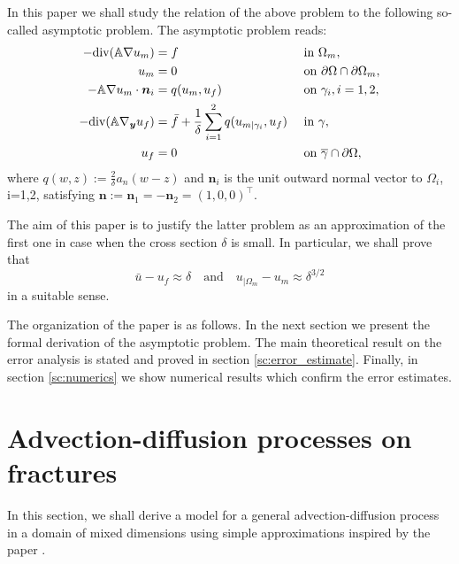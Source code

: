 \documentclass[a4paper]{article}
\def\vc#1{\mathbf{\boldsymbol{#1}}}     %
\def\tn#1{{\mathbb{#1}}}    %
\def\div{{\rm div}}
\def\yy{{\vc y}}
\begin{document}
In this paper we shall study the relation of the above problem to the following so-called asymptotic problem.
The asymptotic problem reads:
\begin{subequations}
\label{eq:asymptotic_pde}
\begin{align}
-\div(\tn A\nabla u_m) &= f &&\mbox{ in }\Omega_m,\\
u_m &= 0 &&\mbox{ on }\partial\Omega\cap\partial\Omega_m,\\
-\tn A\nabla u_m\cdot\vc n_i &= q(u_m,u_f) &&\mbox{ on }\gamma_i,i=1,2,\\
-\div(\tn A\nabla_\yy u_f) &= \bar f + \frac1\delta\sum_{i=1}^2 q(u_{m|\gamma_i},u_f) &&\mbox{ in }\gamma,\\
u_f &= 0 &&\mbox{ on }\overline\gamma\cap\partial\Omega,
\end{align}
\end{subequations}
where $q(w,z):=\frac2\delta a_n(w-z)$ and $\vc n_i$ is the unit outward normal vector to $\Omega_i$, i=1,2, satisfying $\vc n:=\vc n_1=-\vc n_2=(1,0,0)^\top$.

The aim of this paper is to justify the latter problem as an approximation of the first one in case when the cross section $\delta$ is small.
In particular, we shall prove that
\[ \bar u - u_f \approx \delta\quad\mbox{and}\quad u_{|\Omega_m}-u_m \approx \delta^{3/2} \]
in a suitable sense.

The organization of the paper is as follows.
In the next section we present the formal derivation of the asymptotic problem.
The main theoretical result on the error analysis is stated and proved in section \ref{sc:error_estimate}.
Finally, in section \ref{sc:numerics} we show numerical results which confirm the error estimates.






\section{Advection-diffusion processes on fractures}
\label{sc:ad_on_fractures}
In this section, we shall derive a model for a general advection-diffusion process in a domain of mixed dimensions using
simple approximations inspired by the paper \citet{martin_modeling_2005}.
\end{document}
